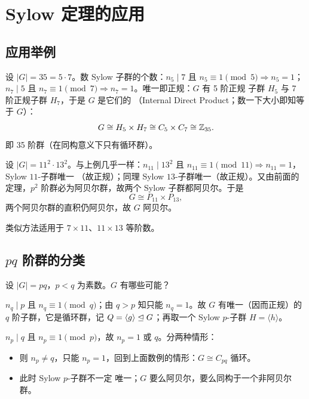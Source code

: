 \section{Sylow 定理的应用}\label{sec:applications}

\subsection{应用举例}

\begin{example}[35 阶群]
设 $|G| = 35 = 5\cdot 7$。数 Sylow 子群的个数：$n_5\mid 7$ 且
$n_5\equiv 1\pmod 5 \Rightarrow n_5 = 1$；$n_7\mid 5$ 且
$n_7\equiv 1\pmod 7 \Rightarrow n_7 = 1$。唯一即正规：$G$ 有 5 阶正规
子群 $H_5$ 与 7 阶正规子群 $H_7$，于是 $G$ 是它们的
（Internal Direct Product；数一下大小即知等于 $G$）：
\[
  G \cong H_5\times H_7 \cong C_5\times C_7 \cong \mathbb{Z}_{35}.
\]
即 35 阶群（在同构意义下只有循环群）。
\end{example}

\begin{example}[$11^2\cdot 13^2$ 阶群]
设 $|G| = 11^2\cdot 13^2$。与上例几乎一样：$n_{11}\mid 13^2$ 且
$n_{11}\equiv 1\pmod{11} \Rightarrow n_{11} = 1$，Sylow $11$-子群唯一
（故正规）；同理 Sylow $13$-子群唯一（故正规）。又由前面的定理，$p^2$
阶群必为阿贝尔群，故两个 Sylow 子群都阿贝尔。于是
\[
  G \cong P_{11}\times P_{13},
\]
两个阿贝尔群的直积仍阿贝尔，故 $G$ 阿贝尔。
\end{example}

类似方法适用于 $7\times 11$、$11\times 13$ 等阶数。

\subsection{$pq$ 阶群的分类}

设 $|G| = pq$，$p<q$ 为素数。$G$ 有哪些可能？

$n_q\mid p$ 且 $n_q\equiv 1\pmod q$；由 $q>p$ 知只能 $n_q = 1$。故 $G$
有唯一（因而正规）的 $q$ 阶子群，它是循环群，记
$Q = \langle g\rangle\trianglelefteq G$；再取一个 Sylow $p$-子群
$H = \langle h\rangle$。

$n_p\mid q$ 且 $n_p\equiv 1\pmod p$，故 $n_p = 1$ 或 $q$。分两种情形：
\begin{itemize}[leftmargin=1.3em,itemsep=2pt]
  \item {}则 $n_p\ne q$，只能
        $n_p = 1$，回到上面数例的情形：$G\cong C_{pq}$ 循环。
  \item {}此时 Sylow $p$-子群不一定
        唯一；$G$ 要么阿贝尔，要么同构于一个非阿贝尔群。
\end{itemize}

